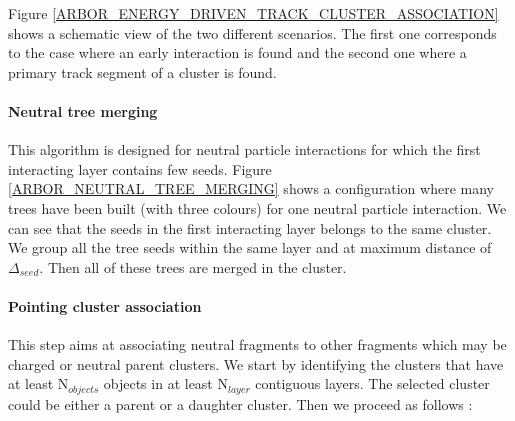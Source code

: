 \documentclass[cits]{JINST}
\begin{document}
Figure \ref{ARBOR_ENERGY_DRIVEN_TRACK_CLUSTER_ASSOCIATION} shows a schematic view of the two different scenarios. The first one corresponds to the case where an early interaction is found and the second one where a primary track segment of a cluster is found.

\paragraph*{Neutral tree merging} This algorithm is designed for neutral particle interactions for which the first interacting layer contains few seeds. Figure \ref{ARBOR_NEUTRAL_TREE_MERGING} shows a configuration where many trees have been built (with three colours) for one neutral particle interaction. We can see that the seeds in the first interacting layer belongs to the same cluster. We group all the tree seeds within the same layer and at maximum distance of $\Delta_{seed}$. Then all of these trees are merged in the cluster.

\paragraph*{Pointing cluster association} This step aims at associating neutral fragments to other fragments which may be charged or neutral parent clusters. We start by identifying the clusters that have at least N$_{objects}$ objects in at least N$_{layer}$ contiguous layers. The selected cluster could be either a parent or a daughter cluster. Then we proceed as follows :
\end{document}
